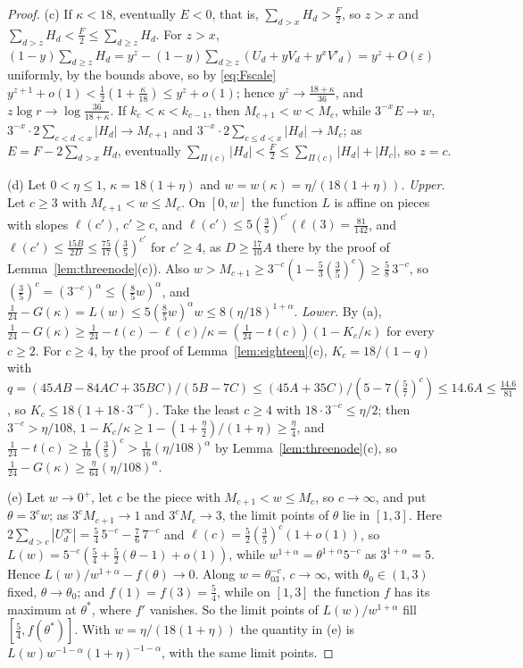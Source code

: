 \documentclass[11pt]{article}
\begin{document}
\begin{proof}
(c) If $\kappa<18$, eventually $E<0$, that is, $\sum_{d>x}H_d>\tfrac F2$, so
$z>x$ and $\sum_{d>z}H_d<\tfrac F2\le\sum_{d\ge z}H_d$.  For $z>x$,
$(1-y)\sum_{d\ge z}H_d=y^z-(1-y)\sum_{d\ge z}(U_d+yV_d+y^xV'_d)=y^z+O(\varepsilon)$
uniformly, by the bounds above, so by \eqref{eq:Fscale}
$y^{z+1}+o(1)<\tfrac12(1+\tfrac\kappa{18})\le y^z+o(1)$; hence
$y^z\to\tfrac{18+\kappa}{36}$, and $z\log r\to\log\tfrac{36}{18+\kappa}$.
If $k_c<\kappa<k_{c-1}$, then $M_{c+1}<w<M_c$, while $3^{-x}E\to w$,
$3^{-x}\cdot2\sum_{c<d<x}|H_d|\to M_{c+1}$ and
$3^{-x}\cdot2\sum_{c\le d<x}|H_d|\to M_c$; as $E=F-2\sum_{d>x}H_d$, eventually
$\sum_{\Pi(c)}|H_d|<\tfrac F2\le\sum_{\Pi(c)}|H_d|+|H_c|$, so $z=c$.

(d) Let $0<\eta\le1$, $\kappa=18(1+\eta)$ and $w=w(\kappa)=\eta/(18(1+\eta))$.
\emph{Upper.}  Let $c\ge3$ with $M_{c+1}<w\le M_c$.  On $[0,w]$ the function
$L$ is affine on pieces with slopes $\ell(c')$, $c'\ge c$, and
$\ell(c')\le5(\tfrac35)^{c'}$ ($\ell(3)=\tfrac{81}{142}$, and
$\ell(c')\le\tfrac{15B}{2D}\le\tfrac{75}{17}(\tfrac35)^{c'}$ for $c'\ge4$,
as $D\ge\tfrac{17}{10}A$ there by the proof of
Lemma~\ref{lem:threenode}(c)).  Also
$w>M_{c+1}\ge3^{-c}(1-\tfrac53(\tfrac35)^c)\ge\tfrac58\,3^{-c}$, so
$(\tfrac35)^c=(3^{-c})^\alpha\le(\tfrac85w)^\alpha$, and
$\tfrac1{24}-G(\kappa)=L(w)\le5(\tfrac85w)^\alpha w\le8(\eta/18)^{1+\alpha}$.
\emph{Lower.}  By (a), $\tfrac1{24}-G(\kappa)\ge\tfrac1{24}-t(c)-\ell(c)/\kappa
=(\tfrac1{24}-t(c))(1-K_c/\kappa)$ for every $c\ge2$.  For $c\ge4$, by the
proof of Lemma~\ref{lem:eighteen}(c), $K_c=18/(1-q)$ with
$q=(45AB-84AC+35BC)/(5B-7C)\le(45A+35C)/(5-7(\tfrac57)^c)\le14.6A\le\tfrac{14.6}{81}$,
so $K_c\le18(1+18\cdot3^{-c})$.  Take the least $c\ge4$ with
$18\cdot3^{-c}\le\eta/2$; then $3^{-c}>\eta/108$, $1-K_c/\kappa\ge
1-(1+\tfrac\eta2)/(1+\eta)\ge\tfrac\eta4$, and
$\tfrac1{24}-t(c)\ge\tfrac1{16}(\tfrac35)^c>\tfrac1{16}(\eta/108)^\alpha$ by
Lemma~\ref{lem:threenode}(c), so $\tfrac1{24}-G(\kappa)\ge\tfrac\eta{64}(\eta/108)^\alpha$.

(e) Let $w\to0^+$, let $c$ be the piece with $M_{c+1}<w\le M_c$, so
$c\to\infty$, and put $\theta=3^cw$; as $3^cM_{c+1}\to1$ and
$3^cM_c\to3$, the limit points of $\theta$ lie in $[1,3]$.  Here
$2\sum_{d>c}|U^\infty_d|=\tfrac54\,5^{-c}-\tfrac76\,7^{-c}$ and
$\ell(c)=\tfrac52(\tfrac35)^c(1+o(1))$, so
$L(w)=5^{-c}(\tfrac54+\tfrac52(\theta-1)+o(1))$, while
$w^{1+\alpha}=\theta^{1+\alpha}5^{-c}$ as $3^{1+\alpha}=5$.  Hence
$L(w)/w^{1+\alpha}-f(\theta)\to0$.  Along $w=\theta_03^{-c}$, $c\to\infty$,
with $\theta_0\in(1,3)$ fixed, $\theta\to\theta_0$; and $f(1)=f(3)=\tfrac54$,
while on $[1,3]$ the function $f$ has its maximum at $\theta^*$, where
$f'$ vanishes.  So the limit points of $L(w)/w^{1+\alpha}$ fill
$[\tfrac54,f(\theta^*)]$.  With $w=\eta/(18(1+\eta))$ the quantity in (e)
is $L(w)w^{-1-\alpha}(1+\eta)^{-1-\alpha}$, with the same limit points.
\end{proof}
\end{document}

